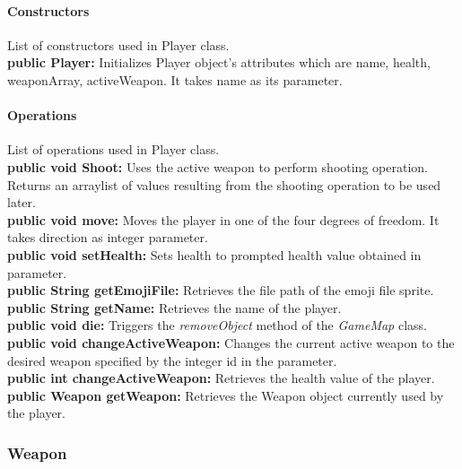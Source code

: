 \documentclass[12pt]{article} %
\begin{document}
\paragraph{Constructors \\}
List of constructors used in Player class.\\
\textbf{public Player:} Initializes Player object's attributes which are name, health, weaponArray, activeWeapon. It takes name as its parameter.

\paragraph{Operations \\}
List of operations used in Player class.\\
\textbf{public void Shoot:} Uses the active weapon to perform shooting operation. Returns an arraylist of values resulting from the shooting operation to be used later.\\
\textbf{public void move:} Moves the player in one of the four degrees of freedom.  It takes direction as integer parameter. \\
\textbf{public void setHealth:} Sets health to prompted health value obtained in parameter. \\
\textbf{public String getEmojiFile:} Retrieves the file path of the emoji file sprite. \\
\textbf{public String getName:} Retrieves the name of the player. \\
\textbf{public void die:} Triggers the \textit{removeObject} method of the \textit{GameMap} class. \\
\textbf{public void changeActiveWeapon:} Changes the current active weapon to the desired weapon specified by the integer id in the parameter. \\
\textbf{public int changeActiveWeapon:} Retrieves the health value of the player. \\
\textbf{public Weapon getWeapon:} Retrieves the Weapon object currently used by the player. 



\subsubsection{Weapon} %
\end{document}
